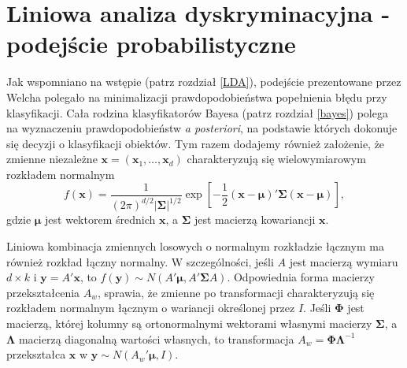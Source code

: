 \documentclass[
]{book}
\theoremstyle{plain}
\theoremstyle{definition}
\theoremstyle{definition}
\theoremstyle{definition}
\theoremstyle{definition}
\theoremstyle{remark}
\let\BeginKnitrBlock\begin \let\EndKnitrBlock\end
\begin{document}
\hypertarget{liniowa-analiza-dyskryminacyjna---podejux15bcie-probabilistyczne}{%
\section{Liniowa analiza dyskryminacyjna - podejście probabilistyczne}\label{liniowa-analiza-dyskryminacyjna---podejux15bcie-probabilistyczne}}

Jak wspomniano na wstępie (patrz rozdział \ref{LDA}), podejście prezentowane przez Welcha polegało na minimalizacji prawdopodobieństwa popełnienia błędu przy klasyfikacji. Cała rodzina klasyfikatorów Bayesa (patrz rozdział \ref{bayes}) polega na wyznaczeniu prawdopodobieństw \emph{a posteriori}, na podstawie których dokonuje się decyzji o klasyfikacji obiektów. Tym razem dodajemy również założenie, że zmienne niezależne \(\boldsymbol{x}=(\boldsymbol{x}_1,\ldots,\boldsymbol{x}_d)\) charakteryzują się wielowymiarowym rozkładem normalnym
\begin{equation}
    f(\boldsymbol{x}) = \frac{1}{(2\pi)^{d/2}|\boldsymbol{\Sigma}|^{1/2}}\exp\left[-\frac{1}{2}(\boldsymbol{x}-\boldsymbol{\mu})'\boldsymbol{\Sigma}(\boldsymbol{x}-\boldsymbol{\mu})\right],
    \label{eq:mnv}
\end{equation}
gdzie \(\boldsymbol{\mu}\) jest wektorem średnich \(\boldsymbol{x}\), a \(\boldsymbol{\Sigma}\) jest macierzą kowariancji \(\boldsymbol{x}\).

\BeginKnitrBlock{remark}
{}Liniowa kombinacja zmiennych losowych o normalnym rozkładzie łącznym ma również rozkład łączny normalny. W szczególności, jeśli \(A\) jest macierzą wymiaru \(d\times k\) i \(\boldsymbol{y} = A'\boldsymbol{x}\), to \(f(\boldsymbol{y})\sim N(A'\boldsymbol{\mu}, A'\boldsymbol{\Sigma}A)\). Odpowiednia forma macierzy przekształcenia \(A_w\), sprawia, że zmienne po transformacji charakteryzują się rozkładem normalnym łącznym o wariancji określonej przez \(I\). Jeśli \(\boldsymbol{\Phi}\) jest macierzą, której kolumny są ortonormalnymi wektorami własnymi macierzy \(\boldsymbol{\Sigma}\), a \(\boldsymbol{\Lambda}\) macierzą diagonalną wartości własnych, to transformacja \(A_w=\boldsymbol{\Phi}\boldsymbol{\Lambda}^{-1}\) przekształca \(\boldsymbol{x}\) w \(\boldsymbol{y}\sim N(A_w'\boldsymbol{\mu}, I)\).
\EndKnitrBlock{remark}
\end{document}
